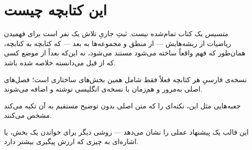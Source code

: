 \chapter*{این کتابچه چیست}

\textit{متسیس} یک کتاب تمام‌شده نیست. ثبتِ جاریِ تلاش یک نفر است برای
فهمیدن ریاضیات از ریشه‌هایش --- از منطق و مجموعه‌ها به بعد --- که
کتابچه به کتابچه، همان‌طور که فهم واقعاً ساخته می‌شود مستند می‌شود،
نه این‌که بعداً از موضع کسی که از قبل می‌دانسته خلاصه شده باشد.

نسخه‌ی فارسیِ هر کتابچه فعلاً فقط شامل همین بخش‌های ساختاری است؛
فصل‌های اصلی به‌مرور و هم‌زمان با نسخه‌ی انگلیسی نوشته و اضافه
می‌شوند.

\begin{notebox}[title=یادداشت]
جعبه‌هایی مثل این، نکته‌ای را که متن اصلی بدون توضیح مستقیم به آن
تکیه می‌کند مشخص می‌کنند.
\end{notebox}

\begin{tipbox}[title=نکته]
این قالب یک پیشنهاد عملی را نشان می‌دهد --- روشی دیگر برای خواندن یک
بخش، یا اشاره‌ای به چیزی که ارزش پیگیری بیشتر دارد.
\end{tipbox}
